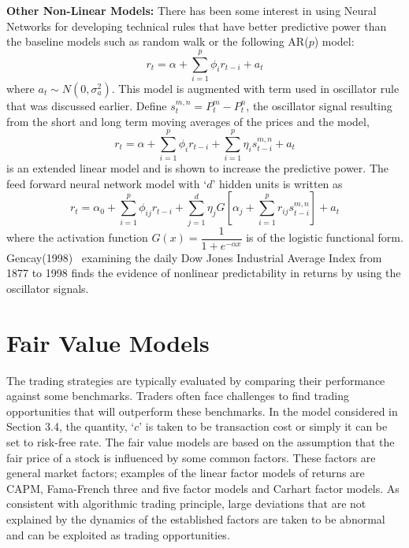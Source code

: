 \noindent \textbf{Other Non-Linear Models:} There has been some interest in using Neural Networks for developing technical rules that have better predictive power than the baseline models such as random walk or the following AR($p$) model:
	\begin{equation}\label{eqn:ri}
	r_t = \alpha + \sum_{i=1}^p\phi_ir_{t-i} + a_t 
	\end{equation}
where $a_t \sim N(0, \sigma_a^2)$. This model is augmented with term used in oscillator rule that was discussed earlier. Define $s_t^{m,n} = P_t^m - P_t^n$, the oscillator signal resulting from the short and long term moving averages of the prices and the model,
	\begin{equation}\label{eqn:rtsum}
	r_t = \alpha + \sum_{i=1}^p\phi_ir_{t-i} + \sum_{i=1}^p\eta_is_{t-i}^{m,n}+ a_t
	\end{equation}
is an extended linear model and is shown to increase the predictive power. The feed forward neural network model with `$d$' hidden units is written as
	\begin{equation}\label{eqn:rtsum2}
	r_t = \alpha_0 + \sum_{i=1}^p \phi_{ij}r_{t-i} + \sum_{j=1}^d \eta_j G\left[\alpha_j + \sum_{i=1}^pr_{ij}s_{t-i}^{m,n} \right] + a_t
	\end{equation}
where the activation function $G(x) = \dfrac{1}{1 + e^{-\alpha x}}$ is of the logistic functional form. Gencay(1998)~\cite{gencay} examining the daily Dow Jones Industrial Average Index from 1877 to 1998 finds the evidence of nonlinear predictability in returns by using the oscillator signals.


\section{Fair Value Models}


The trading strategies are typically evaluated by comparing their performance against some benchmarks. Traders often face challenges to find trading opportunities that will outperform these benchmarks. In the model considered in Section 3.4, the quantity, `$c$' is taken to be transaction cost or simply it can be set to risk-free rate. The fair value models are based on the assumption that the fair price of a stock is influenced by some common factors. These factors are general market factors; examples of the linear factor models of returns are CAPM, Fama-French three and five factor models and Carhart factor models. As consistent with algorithmic trading principle, large deviations that are not explained by the dynamics of the established factors are taken to be abnormal and can be exploited as trading opportunities.


